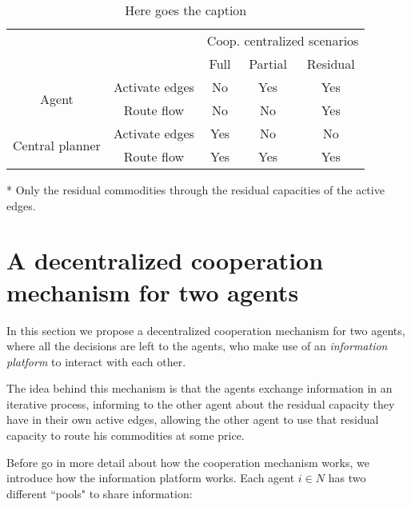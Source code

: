 \documentclass[review]{elsarticle}
\begin{document}
\begin{table}[ht!]
	\centering
	\caption{Here goes the caption \label{tb:summarycentralizedmodels}}
    \begin{threeparttable}
        \begin{tabular}{ccccc}
            & &      \multicolumn{3}{c}{Coop. centralized scenarios} \\\cline{3-5}
            & & Full & Partial & Residual \\ \hline
            \multirow{2}{*}{Agent} & Activate edges & No & Yes & Yes \\
            & Route flow     & No & No & Yes \\\hline
            \multirow{2}{*}{Central planner} & Activate edges & Yes & No & No \\
            & Route flow & Yes & Yes & Yes\tnote{*} \\\hline\hline
        \end{tabular}
    \begin{tablenotes}\footnotesize
        \item[*] Only the residual commodities through the residual capacities
        of the active edges.
        \end{tablenotes}
    \end{threeparttable}
    \end {table}

\section{A decentralized cooperation mechanism for two agents} \label{seq:itermodel}

In this section we propose a decentralized cooperation mechanism for two agents, where all the decisions are left to the agents, who make use of an \emph{information platform} to interact with each other.

The idea behind this mechanism is that the agents exchange information in an iterative process, informing to the other agent about the residual capacity they have in their own active edges, allowing the other agent to use that residual capacity to route his commodities at some price.

Before go in more detail about how the cooperation mechanism works, we introduce how the information platform works. Each agent $i\in N$ has two different ``pools" to share information:
\end{document}
